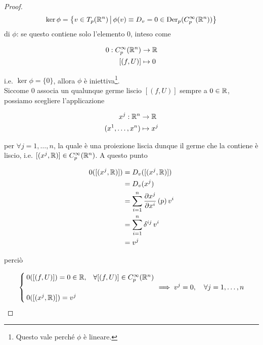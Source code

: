 \begin{proof}
{	\begin{equation}
		\ker \phi = \left\{ v \in T_{p}(\mathbb{R}^{n}) \, \middle| \, \phi(v) \equiv D_{v} = 0 \in \operatorname{Der}_{p}(C_{p}^{\infty}(\mathbb{R}^{n})) \right\}
	\end{equation}%
	} di $ \phi $: se questo contiene solo l'elemento $ 0 $, inteso come
	
	\begin{align}
		\begin{split}
			0 : C_{p}^{\infty}(\mathbb{R}^{n}) &\to \mathbb{R}\\
			[(f,U)] &\mapsto 0
		\end{split}
	\end{align}

	i.e. $ \ker \phi = \{0\} $, allora $ \phi $ è iniettiva\footnote{
		Questo vale perché $ \phi $ è lineare.%
	}.\\
	Siccome $ 0 $ associa un qualunque germe liscio $ [(f,U)] $ sempre a $ 0 \in \mathbb{R} $, possiamo scegliere l'applicazione
	
	\begin{align}
		\begin{split}
			x^{j} : \mathbb{R}^{n} &\to \mathbb{R}\\
			(x^{1},\dots,x^{n}) &\mapsto x^{j}
		\end{split}
	\end{align}

	per $ \forall j=1,\dots,n $, la quale è una proiezione liscia dunque il germe che la contiene è liscio, i.e. $ [(x^{j},\mathbb{R})] \in C_{p}^{\infty}(\mathbb{R}^{n}) $. A questo punto
	
	\begin{align}
		\begin{split}
			0([(x^{j},\mathbb{R})]) &= D_{v} ([(x^{j},\mathbb{R})])\\
			&= D_{v} (x^{j})\\
			&= \sum_{i=1}^{n} \pdv{x^{j}}{x^{i}} \, (p) \, v^{i}\\
			&= \sum_{i=1}^{n} \delta^{ij} \, v^{i}\\
			&= v^{j}
		\end{split}
	\end{align}

	perciò
	
	\begin{equation}
		\begin{cases}
			0([(f,U)]) = 0 \in \R, & \forall [(f,U)] \in C_{p}^{\infty}(\R^{n})\\\\
			0([(x^{j},\R)]) = v^{j}
		\end{cases}%
		 \implies v^{j} = 0 \qcomma \forall j=1,\dots,n
	\end{equation}
	

\end{proof}
